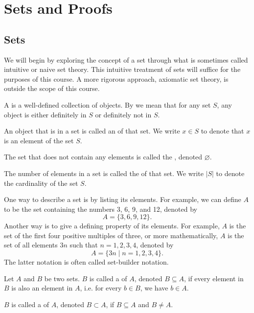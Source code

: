\chapter{Sets and Proofs}

\section{Sets}

We will begin by exploring the concept of a set through what is sometimes called intuitive or naive set theory. This intuitive treatment of sets will suffice for the purposes of this course. A more rigorous approach, axiomatic set theory, is outside the scope of this course.

\begin{defn}
A  is a well-defined collection of objects. By  we mean that for any set $ S $, any object is either definitely in $ S $ or definitely not in $ S $.

An object that is in a set is called an  of that set. We write $ x\in S $ to denote that $ x $ is an element of the set $ S $.

The set that does not contain any elements is called the , denoted $ \varnothing $.

The number of elements in a set is called the  of that set. We write $ \lvert S\rvert $ to denote the cardinality of the set $ S $.
\end{defn}

One way to describe a set is by listing its elements. For example, we can define $ A $ to be the set containing the numbers 3, 6, 9, and 12, denoted by
\begin{equation*}
    A=\{3,6,9,12\}.
\end{equation*}
Another way is to give a defining property of its elements. For example, $ A $ is the set of the first four positive multiples of three, or more mathematically, $ A $ is the set of all elements $ 3n $ such that $ n=1,2,3,4 $, denoted by
\begin{equation*}
    A=\{3n\mid n=1,2,3,4\}.
\end{equation*}
The latter notation is often called set-builder notation.

\begin{defn}
Let $ A $ and $ B $ be two sets. $ B $ is called a  of $ A $, denoted $ B\subseteq A $, if every element in $ B $ is also an element in $ A $, i.e. for every $ b\in B $, we have $ b\in A $.

$ B $ is called a  of $ A $, denoted $ B\subset A $, if $ B\subseteq A $ and $ B\neq A $.
\end{defn}

